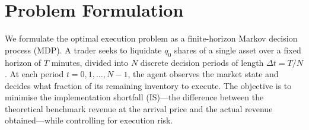 \documentclass[11pt]{article}
\begin{document}

\section{Problem Formulation}\label{sec:problem_formulation}

We formulate the optimal execution problem as a finite-horizon Markov decision process (MDP). A trader seeks to liquidate $q_0$ shares of a single asset over a fixed horizon of $T$ minutes, divided into $N$ discrete decision periods of length $\Delta t = T / N$. At each period $t = 0, 1, \ldots, N-1$, the agent observes the market state and decides what fraction of its remaining inventory to execute. The objective is to minimise the implementation shortfall (IS)---the difference between the theoretical benchmark revenue at the arrival price and the actual revenue obtained---while controlling for execution risk.
\end{document}
